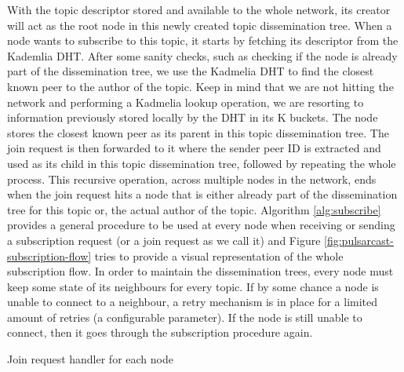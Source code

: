 With the topic descriptor stored and available to the whole network, its
creator will act as the root node in this newly created topic dissemination
tree. When a node wants to subscribe to this topic, it starts by fetching its
descriptor from the Kademlia DHT. After some sanity checks, such as checking if
the node is already part of the dissemination tree, we use the Kadmelia DHT to
find the closest known peer to the author of the topic. Keep in mind that we
are not hitting the network and performing a Kadmelia lookup operation, we are
resorting to information previously stored locally by the DHT in its K buckets.
The node stores the closest known peer as its parent in this topic
dissemination tree. The join request is then forwarded to it where the sender
peer ID is extracted and used as its child in this topic dissemination tree,
followed by repeating the whole process. This recursive operation, across
multiple nodes in the network, ends when the join request hits a node that is
either already part of the dissemination tree for this topic or, the actual
author of the topic. Algorithm \ref{alg:subscribe} provides a general procedure
to be used at every node when receiving or sending a subscription request (or a
join request as we call it) and Figure \ref{fig:pulsarcast-subscription-flow}
tries to provide a visual representation of the whole subscription flow. In
order to maintain the dissemination trees, every node must keep some state of
its neighbours for every topic. If by some chance a node is unable to connect
to a neighbour, a retry mechanism is in place for a limited amount of retries
(a configurable parameter). If the node is still unable to connect, then it
goes through the subscription procedure again.

\begin{algorithm}
  \SetAlgoLined
  \caption{Join request handler for each node}
    \label{alg:subscribe}
\end{algorithm}

